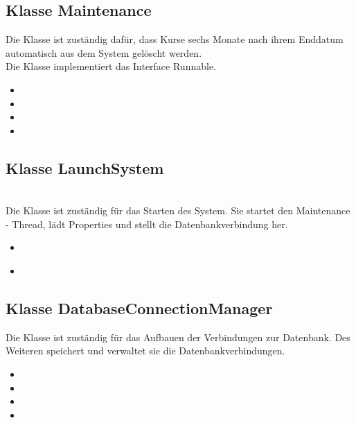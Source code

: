 	\subsection{Klasse Maintenance}
	Die Klasse ist zuständig dafür, dass Kurse sechs Monate nach ihrem Enddatum automatisch aus dem System gelöscht werden.\\
	Die Klasse implementiert das Interface Runnable.
	\begin{itemize}
		\item {}
		\item {}
		\item {}
		\item \override
	\end{itemize}
	
	\subsection{Klasse LaunchSystem}
	\\
	Die Klasse ist zuständig für das Starten des System. Sie startet den Maintenance - Thread, lädt Properties und stellt die Datenbankverbindung her.
	\begin{itemize}
		\item {}\\
		\item {}\\
	\end{itemize}
	
	\subsection{Klasse DatabaseConnectionManager}
	Die Klasse ist zuständig für das Aufbauen der Verbindungen zur Datenbank. Des Weiteren
	speichert und verwaltet sie die Datenbankverbindungen. 
	\begin{itemize}
		\item {}
		\item {}
		\item {}
		\item {}
	\end{itemize}
	
